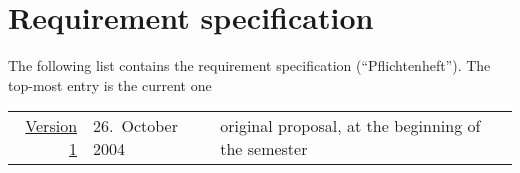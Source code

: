 
\section*{Requirement specification}
\label{sec:requirement specification}

The following list contains the requirement specification
(``Pflichtenheft'').  The top-most entry is the current one

\begin{center}
  \begin{tabular}[t]{r@{\quad}l@{\quad\quad}l@{\quad\quad}p{9cm}}
    \href{requirements/v1}{Version 1}
    &
    26.\ October 2004
    & 
    original proposal, at the beginning of the semester
  \end{tabular}
\end{center}





